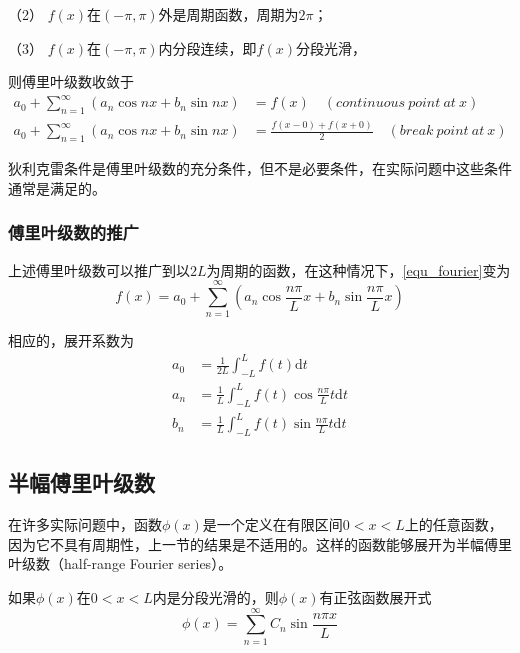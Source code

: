 \documentclass[UTF8,12pt]{ctexart}
\begin{document}
	（2） $ f(x) $在$ (-\pi,\pi) $外是周期函数，周期为$ 2 \pi $；
	
	（3） $ f(x) $在$ (-\pi,\pi) $内分段连续，即$ f(x) $分段光滑，
	
	\noindent 则傅里叶级数收敛于
	\begin{equation}
	\begin{aligned}
	a_{0}+\sum_{n=1}^{\infty}\left(a_{n} \cos n x+b_{n} \sin n x\right)&=f(x)\quad (continuous\ point\ at\ x)\\
	a_{0}+\sum_{n=1}^{\infty}\left(a_{n} \cos n x+b_{n} \sin n x\right)&=\frac{f(x-0)+f(x+0)}{2}\quad (break\ point\ at\ x)
	\end{aligned}\label{equ_Dirichlet}
	\end{equation}
	
	狄利克雷条件是傅里叶级数的充分条件，但不是必要条件，在实际问题中这些条件通常是满足的。
	
	\subsubsection{傅里叶级数的推广}
	上述傅里叶级数可以推广到以$ 2L $为周期的函数，在这种情况下，\autoref{equ_fourier}变为
	\begin{equation}
	f(x)=a_{0}+\sum_{n=1}^{\infty}\left(a_{n} \cos \frac{n \pi}{L} x+b_{n} \sin \frac{n \pi}{L} x\right)
	\end{equation}
	
\noindent 相应的，展开系数为
\begin{equation}
\begin{aligned} a_{0} &=\frac{1}{2 L} \int_{-L}^{L} f(t) \mathrm{d} t \\ a_{n} &=\frac{1}{L} \int_{-L}^{L} f(t) \cos \frac{n \pi}{L} t \mathrm{d} t \\ b_{n} &=\frac{1}{L} \int_{-L}^{L} f(t) \sin \frac{n \pi}{L} t \mathrm{d} t \end{aligned}
\end{equation}

	\subsection{半幅傅里叶级数}
	在许多实际问题中，函数$ \phi (x) $是一个定义在有限区间$ 0<x<L $上的任意函数，因为它不具有周期性，上一节的结果是不适用的。这样的函数能够展开为半幅傅里叶级数（half-range Fourier series）。
	
	如果$ \phi (x) $在$ 0<x<L $内是分段光滑的，则$ \phi (x) $有正弦函数展开式
	\begin{equation}
	\phi(x)=\sum_{n=1}^{\infty} C_{n} \sin \frac{n \pi x}{L}
	\end{equation}
	
\end{document}
